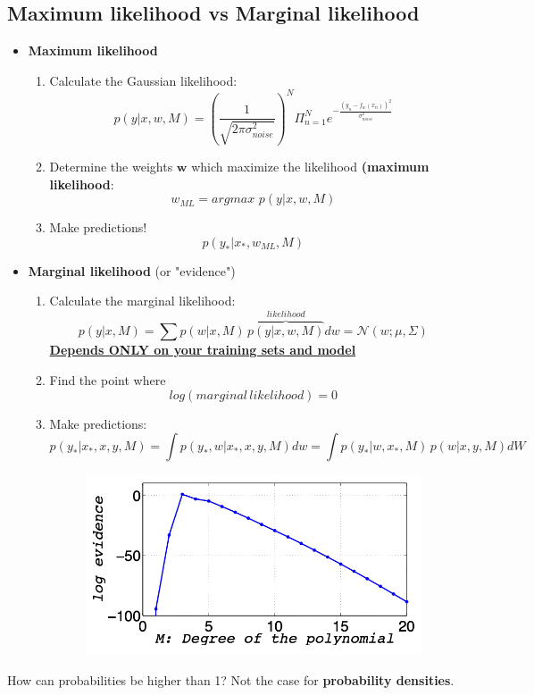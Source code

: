 \documentclass[a4paper,11pt]{article}
\begin{document}
\subsection{Maximum likelihood vs Marginal likelihood}
\begin{itemize}
	\item \textbf{Maximum likelihood}
	\begin{enumerate}
		\item Calculate the Gaussian likelihood:
		\[  p(y|x,w,M) = (\frac{1}{\sqrt{2\pi \sigma_{noise}^2}})^N \Pi_{n=1}^N e^{-\frac{(y_n-f_w(x_n))^2}{\sigma_{noise}^2}}\]
		\item Determine the weights $\mathbf{w}$ which maximize the likelihood \textbf{(maximum likelihood}:
		\[
		w_{ML}=argmax \, \, p(y|x,w,M)
		\]
		\item Make predictions!
		\[
		p(y_*|x_*,w_{ML},M)
		\]
	\end{enumerate}
	\item \textbf{Marginal likelihood} (or "evidence")
	\begin{enumerate}
		\item Calculate the marginal likelihood:
		\[
		p(y|x,M)=\sum p(w|x,M)\,\overbrace{p(y|x,w,M)}^{likelihood}dw = \mathcal{N}(w;\mu,\Sigma)
		\]		
		\textbf{\underline{Depends ONLY on your training sets and model}}\\
		\item Find the point where \[log(marginal\,likelihood) = 0\]
		\item Make predictions:
		\[
		p(y_*|x_*,x,y,M)=\int p(y_*,w|x_*,x,y,M)dw = \int p(y_*|w,x_*,M)\,p(w|x,y,M)dW
		\]
		\begin{figure}[h]
			\centering
			\includegraphics[width=.5\linewidth]{figures/razor.png}
		\end{figure}
	\end{enumerate}

\end{itemize}
How can probabilities be higher than 1? Not the case for \textbf{probability densities}.
\end{document}
